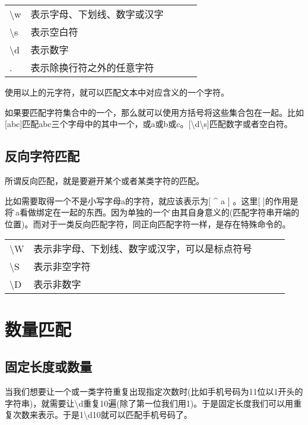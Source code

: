\documentclass[a4papaer,utf8,12pt,draft,titlepage]{ctexart}
\begin{document}
		\begin{table}[h]
			\begin{tabular}{lllll}
				\textbackslash{}w & 表示字母、下划线、数字或汉字 &  &  &  \\
				\textbackslash{}s & 表示空白符          &  &  &  \\
				\textbackslash{}d & 表示数字           &  &  &  \\
				.                 & 表示除换行符之外的任意字符  &  &  & 
			\end{tabular}
		\end{table}
			使用以上的元字符，就可以匹配文本中对应含义的一个字符。	
			
			如果要匹配字符集合中的一个，那么就可以使用方括号将这些集合包在一起。比如[abc]匹配abc三个字母中的其中一个，或a或b或c。[\textbackslash{}d\textbackslash{}s]匹配数字或者空白符。
			\subsection{反向字符匹配}
			所谓反向匹配，就是要避开某个或者某类字符的匹配。
			
			比如需要取得一个不是小写字母a的字符，就应该表示为[ \^{} a ] 。这里[ ]的作用是将\^和a看做绑定在一起的东西。因为单独的一个\^是由其自身意义的(匹配字符串开端的位置)。而对于一类反向匹配字符，同正向匹配字符一样，是存在特殊命令的。
			\begin{table}[h]
				\begin{tabular}{lllll}
					\textbackslash{}W & 表示非字母、下划线、数字或汉字，可以是标点符号 &  &  &  \\
					\textbackslash{}S & 表示非空字符          &  &  &  \\
					\textbackslash{}D & 表示非数字           &  &  &  \\
				\end{tabular}
			\end{table}
		\section{数量匹配}
			\subsection{固定长度或数量}
				当我们想要让一个或一类字符重复出现指定次数时(比如手机号码为11位以1开头的字符串)，就需要让\textbackslash{}d重复10遍(除了第一位我们用1)。于是固定长度我们可以用{重复次数}来表示。于是1\textbackslash{}d{10}就可以匹配手机号码了。
				
\end{document}
